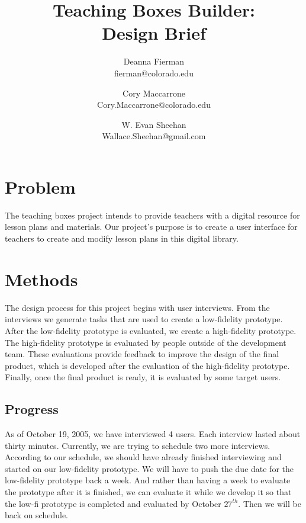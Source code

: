 \documentclass[12pt,titlepage]{article}
\title{Teaching Boxes Builder: \\ Design Brief}
\author{Deanna Fierman  \\ \small{fierman@colorado.edu} \and
        Cory Maccarrone \\ \small{Cory.Maccarrone@colorado.edu} \and
		W. Evan Sheehan \\ \small{Wallace.Sheehan@gmail.com}}
\newcommand{\blankpage}{\hfill\thispagestyle{empty}\pagebreak\addtocounter{page}{-1}}
\begin{document}
\maketitle

\blankpage

\tableofcontents
\cfoot{\hrule \thepage}
\pagebreak

\blankpage


\section{Problem}
The teaching boxes project intends to provide teachers with a digital resource
for lesson plans and materials. Our project's purpose is to create a user
interface for teachers to create and modify lesson plans in this digital
library.

\section{Methods}
The design process for this project begins with user interviews. From the
interviews we generate tasks that are used to create a low-fidelity prototype.
After the low-fidelity prototype is evaluated, we create a high-fidelity
prototype. The high-fidelity prototype is evaluated by people outside of
the development team. These evaluations provide feedback to improve the design
of the final product, which is developed after the evaluation of the
high-fidelity prototype. Finally, once the final product is ready, it is
evaluated by some target users.

\subsection{Progress}
As of October 19, 2005, we have interviewed 4 users. Each interview lasted about
thirty minutes.  Currently, we are trying to schedule two more interviews.
According to our schedule, we should have already finished interviewing and
started on our low-fidelity prototype. We will have to push the due date for the
low-fidelity prototype back a week. And rather than having a week to evaluate
the prototype after it is finished, we can evaluate it while we develop it so
that the low-fi prototype is completed and evaluated by October $27^{th}$. Then
we will be back on schedule.
\end{document}
